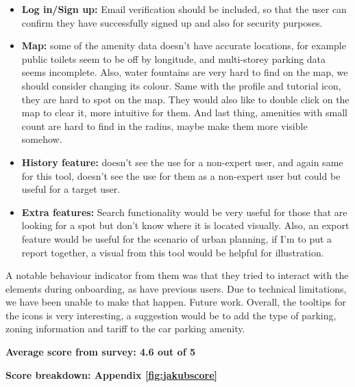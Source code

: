 \begin{itemize}
  \item \textbf{Log in/Sign up: }Email verification should be included, so
        that the user can confirm they have successfully signed up and also for
        security purposes.
        \vspace{0.2cm}
        
  \item \textbf{Map: }some of the amenity data doesn't have accurate
        locations, for example public toilets seem to be off by longitude, and
        multi-storey parking data seems incomplete. Also, water fountains are very
        hard to find on the map, we should consider changing its colour. Same with
        the profile and tutorial icon, they are hard to spot on the map. They would
        also like to double click on the map to clear it, more intuitive for them.
        And last thing, amenities with small count are hard to find in the radius,
        maybe make them more visible somehow.
        \vspace{0.2cm}
        
  \item \textbf{History feature: }doesn't see the use for a non-expert user,
        and again same for this tool, doesn't see the use for them as a non-expert
        user but could be useful for a target user.
        \vspace{0.2cm}
        
  \item \textbf{Extra features: }Search functionality would be very useful for
        those that are looking for a spot but don't know where it is located
        visually. Also, an export feature would be useful for the scenario of urban
        planning, if I'm to put a report together, a visual from this tool would be
        helpful for illustration.
\end{itemize}

\newpage{}

A notable behaviour indicator from them was that they tried to interact with the
elements during onboarding, as have previous users. Due to technical
limitations, we have been unable to make that happen. Future work.
Overall, the tooltips for the icons is very interesting, a suggestion would be
to add the type of parking, zoning information and tariff to the car parking
amenity.

\textbf{Average score from survey: 4.6 out of 5}

\hspace{2em}\textbf{Score breakdown: Appendix \ref{fig:jakubscore}}

